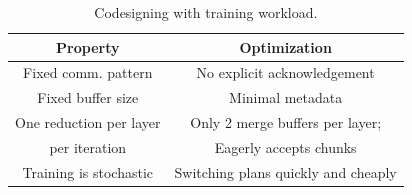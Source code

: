 





\begin{table}[t]
	\centering
	\small
	\begin{tabular}{|c|c|}
		\hline 
		Property & \ha Optimization \\
		\hline
		Fixed comm. pattern & No explicit acknowledgement \\
		\hline
		Fixed buffer size & Minimal metadata \\
		\hline
		One reduction per layer & Only 2 merge buffers per layer; \\
		       per iteration    & Eagerly accepts chunks \\
		\hline
		Training is stochastic & Switching plans quickly and cheaply \\ 
		\hline
		
	\end{tabular}
	\caption{Codesigning \ha with training workload.}
	\label{table:codesign2lha}
\end{table}

